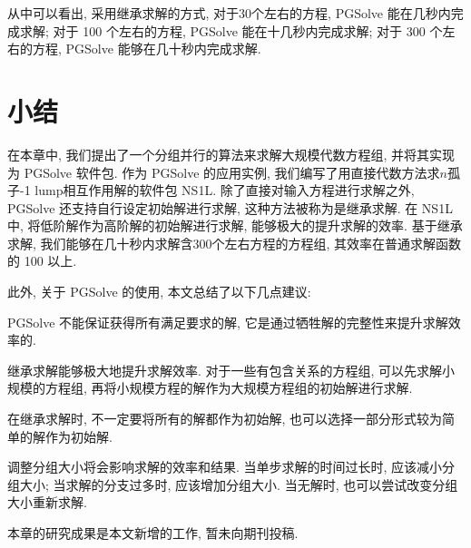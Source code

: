 从中可以看出, 采用继承求解的方式, 对于30个左右的方程, PGSolve 能在几秒内完成求解; 对于 100 个左右的方程, PGSolve 能在十几秒内完成求解; 对于 300 个左右的方程, PGSolve 能够在几十秒内完成求解. 
 

\section{小结}
在本章中, 我们提出了一个分组并行的算法来求解大规模代数方程组, 并将其实现为 PGSolve 软件包. 作为 PGSolve 的应用实例, 我们编写了用直接代数方法求$n$孤子-1 lump相互作用解的软件包 NS1L. 除了直接对输入方程进行求解之外, PGSolve 还支持自行设定初始解进行求解, 这种方法被称为是继承求解. 在 NS1L 中, 将低阶解作为高阶解的初始解进行求解, 能够极大的提升求解的效率. 基于继承求解, 我们能够在几十秒内求解含300个左右方程的方程组, 其效率在普通求解函数的 100 以上. 

此外, 关于 PGSolve 的使用, 本文总结了以下几点建议:
\begin{compactenum}[(1)]
\item PGSolve 不能保证获得所有满足要求的解, 它是通过牺牲解的完整性来提升求解效率的.
\item 继承求解能够极大地提升求解效率. 对于一些有包含关系的方程组, 可以先求解小规模的方程组, 再将小规模方程的解作为大规模方程组的初始解进行求解. 
\item 在继承求解时, 不一定要将所有的解都作为初始解, 也可以选择一部分形式较为简单的解作为初始解.
\item 调整分组大小将会影响求解的效率和结果. 当单步求解的时间过长时, 应该减小分组大小; 当求解的分支过多时, 应该增加分组大小. 当无解时, 也可以尝试改变分组大小重新求解. 
\end{compactenum}
 
本章的研究成果是本文新增的工作, 暂未向期刊投稿. 

